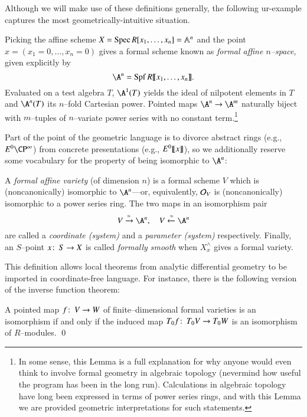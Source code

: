 Although we will make use of these definitions generally, the following ur-example captures the most geometrically-intuitive situation.

\begin{example}\label{MapsOfFVarsArePowerSeries}
Picking the affine scheme $X = \operatorname{Spec} R[x_1, \ldots, x_n] = \mathbb A^n$ and the point $x = (x_1 = 0, \ldots, x_n = 0)$ gives a formal scheme known as \textit{formal affine $n$--space}, given explicitly by \[\A^n = \Spf R\llbracket x_1, \ldots, x_n\rrbracket.\]  Evaluated on a test algebra $T$, $\A^1(T)$ yields the ideal of nilpotent elements in $T$ and $\A^n(T)$ its $n$--fold Cartesian power.  Pointed maps $\A^n \to \A^m$ naturally biject with $m$--tuples of $n$--variate power series with no constant term.\footnote{In some sense, this Lemma is a full explanation for why anyone would even think to involve formal geometry in algebraic topology (nevermind how useful the program has been in the long run).  Calculations in algebraic topology have long been expressed in terms of power series rings, and with this Lemma we are provided geometric interpretations for such statements.}
\end{example}

Part of the point of the geometric language is to divorce abstract rings (e.g., $E^0 \CP^\infty$) from concrete presentations (e.g., $E^0\llbracket{x}\rrbracket$), so we additionally reserve some vocabulary for the property of being isomorphic to $\A^n$:
\begin{definition}\label{DefnFormalVariety}
A \textit{formal affine variety} (of dimension $n$) is a formal scheme $V$ which is (noncanonically) isomorphic to $\A^n$---or, equivalently, $\mathcal{O}_V$ is (noncanonically) isomorphic to a power series ring.  The two maps in an isomorphism pair \[V \xrightarrow{\simeq} \A^n, \quad V \xleftarrow{\simeq} \A^n\] are called a \textit{coordinate (system)} and a \textit{parameter (system)} respectively.  Finally, an $S$--point $x\colon\thinspace S \to X$ is called \textit{formally smooth} when $X^\wedge_x$ gives a formal variety.
\end{definition}

This definition allows local theorems from analytic differential geometry to be imported in coordinate-free language.  For instance, there is the following version of the inverse function theorem:
\begin{theorem}\label{InverseFunctionTheoremForFVars}
A pointed map $f\colon\thinspace V \to W$ of finite--dimensional formal varieties is an isomorphism if and only if the induced map $T_0 f\colon\thinspace T_0 V \to T_0 W$ is an isomorphism of $R$--modules. \qed
\end{theorem}

